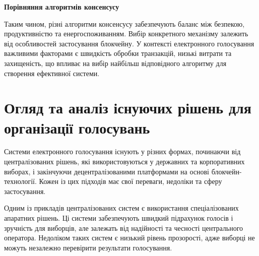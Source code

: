 \documentclass[14pt]{extreport}
\begin{document}
  \begin{table}[H]
  \centering
  \renewcommand{\tablename}{Таблиця}
  \renewcommand{\thetable}{\thechapter.\arabic{table}.}
  \captionsetup{justification=raggedleft, singlelinecheck=false, labelsep=period}
  \caption{}
  \textbf{Порівняння алгоритмів консенсусу\vspace{5pt}}
  \label{tab:consensus_comparison_compact}
  \end{table}
  
  Таким чином, різні алгоритми консенсусу забезпечують баланс між безпекою, продуктивністю та енергоспоживанням. Вибір конкретного механізму залежить від особливостей застосування блокчейну. У контексті електронного голосування важливими факторами є швидкість обробки транзакцій, низькі витрати та захищеність, що впливає на вибір найбільш відповідного алгоритму для створення ефективної системи.
  
  \section{Огляд та аналіз існуючих рішень для організації голосувань}
  
  Системи електронного голосування існують у різних формах, починаючи від централізованих рішень, які використовуються у державних та корпоративних виборах, і закінчуючи децентралізованими платформами на основі блокчейн-технології. Кожен із цих підходів має свої переваги, недоліки та сферу застосування.

  Одним із прикладів централізованих систем є використання спеціалізованих апаратних рішень. Ці системи забезпечують швидкий підрахунок голосів і зручність для виборців, але залежать від надійності та чесності центрального оператора. Недоліком таких систем є низький рівень прозорості, адже виборці не можуть незалежно перевірити результати голосування.
\end{document}
